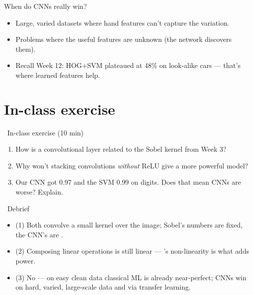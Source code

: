 \documentclass[10pt,aspectratio=169]{beamer}
\begin{document}
\begin{frame}{When do CNNs really win?}
  \begin{itemize}
    \item Large, varied datasets where hand features can't capture the variation.
    \item Problems where the useful features are unknown (the network discovers them).
    \item Recall Week 12: HOG+SVM plateaued at 48\% on look-alike cars — that's where learned features help.
  \end{itemize}
\end{frame}

\section{In-class exercise}

\begin{frame}{\faPen~In-class exercise (10 min)}
  \begin{infobox}
  \end{infobox}
  \begin{enumerate}
    \item How is a convolutional layer related to the Sobel kernel from Week 3?
    \item Why won't stacking convolutions \emph{without} ReLU give a more powerful model?
    \item Our CNN got 0.97 and the SVM 0.99 on digits. Does that mean CNNs are worse? Explain.
  \end{enumerate}
\end{frame}

\begin{frame}{\faPen~Debrief}
  \begin{itemize}
    \item (1) Both convolve a small kernel over the image; Sobel's numbers are fixed, the CNN's are .
    \item (2) Composing linear operations is still linear — 's non-linearity is what adds power.
    \item (3) No — on easy clean data classical ML is already near-perfect; CNNs win on hard, varied,
          large-scale data and via transfer learning.
  \end{itemize}
\end{frame}
\end{document}
